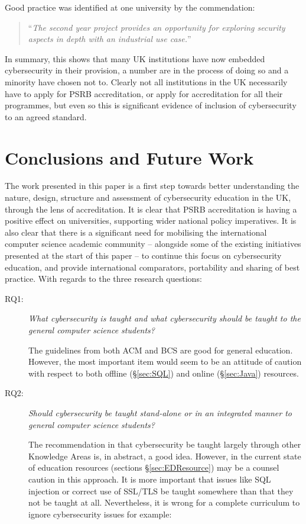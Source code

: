 \documentclass[conference]{IEEEtran}
\begin{document}
{Good practice was identified at one university by the commendation:

 \begin{quote}
``{\emph{The second year project provides an opportunity for exploring security aspects in depth with an industrial use case.}}''
\end{quote}

In summary, this shows that many UK institutions have now embedded cybersecurity in their provision, a number are in the process of doing so and a minority have chosen not to. Clearly not all institutions in the UK necessarily have to apply for PSRB accreditation, or apply for accreditation for all their programmes, but even so this is significant evidence of inclusion of cybersecurity to an agreed standard.

\section{Conclusions and Future Work}

The work presented in this paper is a first step towards better understanding the nature, design, structure and assessment of cybersecurity education in the UK, through the lens of accreditation. It is clear that PSRB accreditation is having a positive effect on universities, supporting wider national policy imperatives. It is also clear that there is a significant need for mobilising the international computer science academic community -- alongside some of the existing initiatives presented at the start of this paper -- to continue this focus on cybersecurity education, and provide international comparators, portability and sharing of best practice. With regards to the three research questions:

\begin{description}
\item[RQ1:] {\emph{What cybersecurity is taught and what cybersecurity should be taught to the general computer science students?}}

The guidelines from both ACM and BCS are good for general education. However, the most important item would seem to be an attitude of caution with respect to both offline (\S\ref{sec:SQL}) and online (\S\ref{sec:Java}) resources. 

\item[RQ2:] {\emph{Should cybersecurity be taught stand-alone or in an integrated manner to general computer science students?}}

The recommendation in \cite[p. 98]{ACM2013a} that cybersecurity be taught largely through other Knowledge Areas is, in abstract, a good idea.  However, in the current state of education resources (sections \S\ref{sec:EDResource}) may be a counsel caution in this approach.  It is more important that issues like SQL injection \cite{Drop2019} or correct use of SSL/TLS \cite{Chenetal2019a} be taught somewhere than that they not be taught at all. Nevertheless, it is wrong for a complete curriculum to ignore cybersecurity issues for example:


\end{description}}
\end{document}
